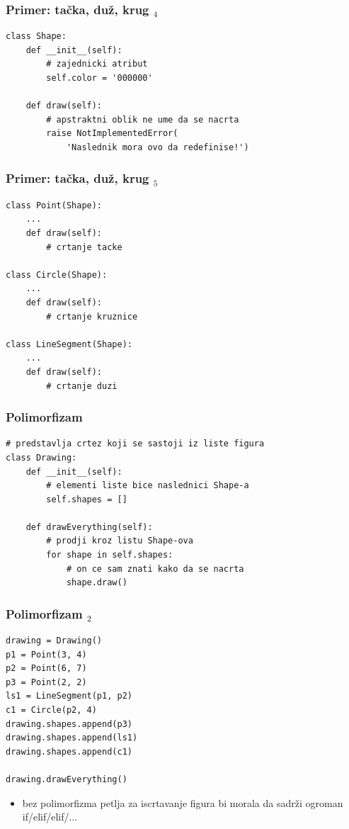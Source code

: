 \documentclass[utf8,compress]{beamer}
\begin{document}
\begin{frame}[fragile]
  \frametitle{Primer: tačka, duž, krug $_4$}
\begin{verbatim}
class Shape:
    def __init__(self):
        # zajednicki atribut
        self.color = '000000'

    def draw(self):
        # apstraktni oblik ne ume da se nacrta
        raise NotImplementedError(
            'Naslednik mora ovo da redefinise!')
\end{verbatim}
\end{frame}

\begin{frame}
  \frametitle{Primer: tačka, duž, krug $_5$}
\begin{verbatim}
class Point(Shape):
    ...
    def draw(self):
        # crtanje tacke

class Circle(Shape):
    ...
    def draw(self):
        # crtanje kruznice

class LineSegment(Shape):
    ...
    def draw(self):
        # crtanje duzi
\end{verbatim}
\end{frame}

\begin{frame}[fragile]
  \frametitle{Polimorfizam}
\begin{verbatim}
# predstavlja crtez koji se sastoji iz liste figura
class Drawing:
    def __init__(self):
        # elementi liste bice naslednici Shape-a
        self.shapes = []

    def drawEverything(self):
        # prodji kroz listu Shape-ova
        for shape in self.shapes:
            # on ce sam znati kako da se nacrta
            shape.draw()
\end{verbatim}
\end{frame}

\begin{frame}[fragile]
  \frametitle{Polimorfizam $_2$}
\begin{verbatim}
drawing = Drawing()
p1 = Point(3, 4)
p2 = Point(6, 7)
p3 = Point(2, 2)
ls1 = LineSegment(p1, p2)
c1 = Circle(p2, 4)
drawing.shapes.append(p3)
drawing.shapes.append(ls1)
drawing.shapes.append(c1)

drawing.drawEverything()
\end{verbatim}
  \begin{itemize}
    \item bez polimorfizma petlja za iscrtavanje figura bi morala da sadrži ogroman if/elif/elif/...
  \end{itemize}
\end{frame}
\end{document}
